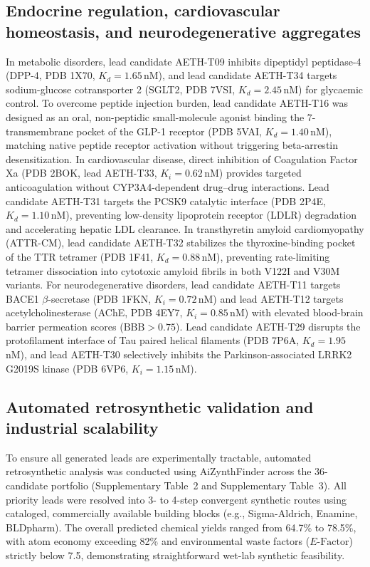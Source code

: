 \documentclass[11pt,a4paper]{article}
\begin{document}
\subsection*{Endocrine regulation, cardiovascular homeostasis, and neurodegenerative aggregates}
In metabolic disorders, lead candidate AETH-T09 inhibits dipeptidyl peptidase-4 (DPP-4, PDB 1X70, $K_d = 1.65$\,nM), and lead candidate AETH-T34 targets sodium-glucose cotransporter 2 (SGLT2, PDB 7VSI, $K_d = 2.45$\,nM) for glycaemic control. To overcome peptide injection burden, lead candidate AETH-T16 was designed as an oral, non-peptidic small-molecule agonist binding the 7-transmembrane pocket of the GLP-1 receptor (PDB 5VAI, $K_d = 1.40$\,nM), matching native peptide receptor activation without triggering beta-arrestin desensitization. In cardiovascular disease, direct inhibition of Coagulation Factor Xa (PDB 2BOK, lead AETH-T33, $K_i = 0.62$\,nM) provides targeted anticoagulation without CYP3A4-dependent drug--drug interactions. Lead candidate AETH-T31 targets the PCSK9 catalytic interface (PDB 2P4E, $K_d = 1.10$\,nM), preventing low-density lipoprotein receptor (LDLR) degradation and accelerating hepatic LDL clearance. In transthyretin amyloid cardiomyopathy (ATTR-CM), lead candidate AETH-T32 stabilizes the thyroxine-binding pocket of the TTR tetramer (PDB 1F41, $K_d = 0.88$\,nM), preventing rate-limiting tetramer dissociation into cytotoxic amyloid fibrils in both V122I and V30M variants. For neurodegenerative disorders, lead candidate AETH-T11 targets BACE1 $\beta$-secretase (PDB 1FKN, $K_i = 0.72$\,nM) and lead AETH-T12 targets acetylcholinesterase (AChE, PDB 4EY7, $K_i = 0.85$\,nM) with elevated blood-brain barrier permeation scores ($\text{BBB} > 0.75$). Lead candidate AETH-T29 disrupts the protofilament interface of Tau paired helical filaments (PDB 7P6A, $K_d = 1.95$\,nM), and lead AETH-T30 selectively inhibits the Parkinson-associated LRRK2 G2019S kinase (PDB 6VP6, $K_i = 1.15$\,nM).

\subsection*{Automated retrosynthetic validation and industrial scalability}
To ensure all generated leads are experimentally tractable, automated retrosynthetic analysis was conducted using AiZynthFinder across the 36-candidate portfolio (Supplementary Table~2 and Supplementary Table~3). All priority leads were resolved into 3- to 4-step convergent synthetic routes using cataloged, commercially available building blocks (e.g., Sigma-Aldrich, Enamine, BLDpharm). The overall predicted chemical yields ranged from 64.7\% to 78.5\%, with atom economy exceeding 82\% and environmental waste factors ($E\text{-Factor}$) strictly below 7.5, demonstrating straightforward wet-lab synthetic feasibility.
\end{document}
